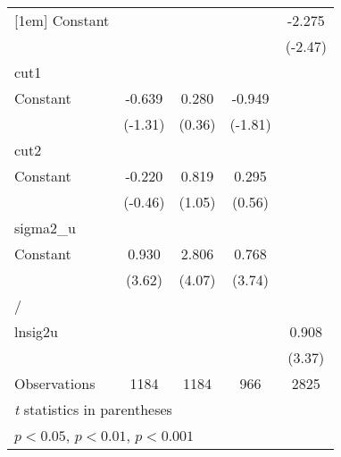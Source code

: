 {\begin{longtable}{l*{4}{c}}
[1em]
Constant        &                  &                  &                  &   -2.275\sym{*}  \\
                &                  &                  &                  &  (-2.47)         \\
\hline
cut1            &                  &                  &                  &                  \\
Constant        &   -0.639         &    0.280         &   -0.949         &                  \\
                &  (-1.31)         &   (0.36)         &  (-1.81)         &                  \\
\hline
cut2            &                  &                  &                  &                  \\
Constant        &   -0.220         &    0.819         &    0.295         &                  \\
                &  (-0.46)         &   (1.05)         &   (0.56)         &                  \\
\hline
sigma2\_u        &                  &                  &                  &                  \\
Constant        &    0.930\sym{***}&    2.806\sym{***}&    0.768\sym{***}&                  \\
                &   (3.62)         &   (4.07)         &   (3.74)         &                  \\
\hline
/               &                  &                  &                  &                  \\
lnsig2u         &                  &                  &                  &    0.908\sym{***}\\
                &                  &                  &                  &   (3.37)         \\
\hline
Observations    &     1184         &     1184         &      966         &     2825         \\
\hline\hline
\multicolumn{5}{l}{\footnotesize \textit{t} statistics in parentheses}\\
\multicolumn{5}{l}{\footnotesize \sym{*} \(p<0.05\), \sym{**} \(p<0.01\), \sym{***} \(p<0.001\)}\\
\end{longtable}
}
